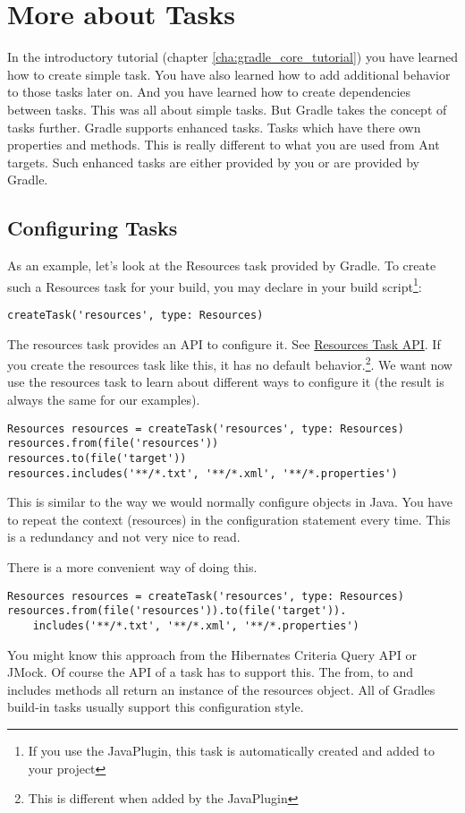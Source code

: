\chapter{More about Tasks} %
\label{cha:more_about_tasks}
In the introductory tutorial (chapter \ref{cha:gradle_core_tutorial}) you have learned how to create simple task. You have also learned how to add additional behavior to those tasks later on. And you have learned how to create dependencies between tasks. This was all about simple tasks. But Gradle takes the concept of tasks further. Gradle supports enhanced tasks. Tasks which have there own properties and methods. This is really different to what you are used from Ant targets. Such enhanced tasks are either provided by you or are provided by Gradle.

\section{Configuring Tasks} %
\label{sec:configuring_tasks}
As an example, let's look at the Resources task provided by Gradle. To create such a Resources task for your build, you may declare in your build script\footnote{If you use the JavaPlugin, this task is automatically created and added to your project}:
\begin{Verbatim}
createTask('resources', type: Resources)
\end{Verbatim}
The resources task provides an API to configure it. See \href{\API tasks/Resources.html}{Resources Task API}. If you create the resources task like this, it has no default behavior.\footnote{This is different when added by the JavaPlugin}. We want now use the resources task to learn about different ways to configure it (the result is always the same for our examples).
\begin{Verbatim}
Resources resources = createTask('resources', type: Resources)
resources.from(file('resources'))
resources.to(file('target'))
resources.includes('**/*.txt', '**/*.xml', '**/*.properties')	
\end{Verbatim}
This is similar to the way we would normally configure objects in Java. You have to repeat the context (resources) in the configuration statement every time. This is a redundancy and not very nice to read.

There is a more convenient way of doing this.
\begin{Verbatim}
Resources resources = createTask('resources', type: Resources)
resources.from(file('resources')).to(file('target')).
	includes('**/*.txt', '**/*.xml', '**/*.properties')	
\end{Verbatim}
You might know this approach from the Hibernates Criteria Query API or JMock. Of course the API of a task has to support this. The from, to and includes methods all return an instance of the resources object. All of Gradles build-in tasks usually support this configuration style.

